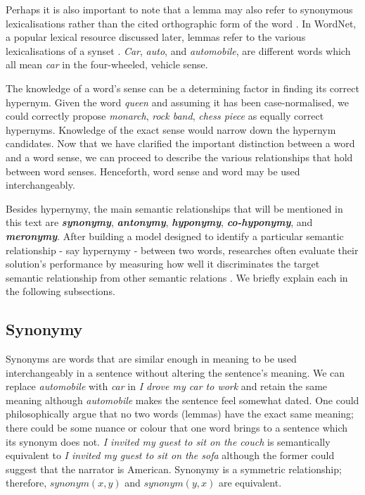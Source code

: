 Perhaps it is also important to note that a lemma may also refer to synonymous lexicalisations rather than the cited orthographic form of the word \citep{Jurafsky2009}.  In WordNet, a popular lexical resource discussed later, lemmas refer to the various lexicalisations of a \ac{synset} \citep{Miller1995}.  \textit{Car}, \textit{auto}, and \textit{automobile}, are different words which all mean \textit{car} in the four-wheeled, vehicle sense.  

The knowledge of a word’s sense can be a determining factor in finding its correct hypernym.  Given the word \textit{queen} and assuming it has been case-normalised, we could correctly propose \textit{monarch}, \textit{rock band}, \textit{chess piece} as equally correct hypernyms.   Knowledge of the exact sense would narrow down the hypernym candidates.  Now that we have clarified the important distinction between a word and a word sense, we can proceed to describe the various relationships that hold between word senses.  Henceforth, word sense and word may be used interchangeably.

Besides hypernymy, the main semantic relationships that will be mentioned in this text are \textbf{\textit{synonymy}}, \textbf{\textit{antonymy}}, \textbf{\textit{hyponymy}}, \textbf{\textit{co-hyponymy}}, and \textbf{\textit{meronymy}}.  After building a model designed to identify a particular semantic relationship - say hypernymy - between two words, researches often evaluate their solution’s performance by measuring how well it discriminates the target semantic relationship from other semantic relations \citep{shwartz2017siege, nguyen2017hierarchical, shwartz2016path}.  We briefly explain each in the following subsections.

\subsection{Synonymy}
Synonyms are words that are similar enough in meaning to be used interchangeably in a sentence without altering the sentence’s meaning.  We can replace \textit{automobile} with \textit{car} in \textit{I drove my car to work} and retain the same meaning although \textit{automobile} makes the sentence feel somewhat dated.  One could philosophically argue that no two words (lemmas) have the exact same meaning; there could be some nuance or colour that one word brings to a sentence which its synonym does not.  \textit{I invited my guest to sit on the couch} is semantically equivalent to \textit{I invited my guest to sit on the sofa} although the former could suggest that the narrator is American.  Synonymy is a symmetric relationship; therefore, \(synonym(x, y)\) and \(synonym(y, x)\) are equivalent.

